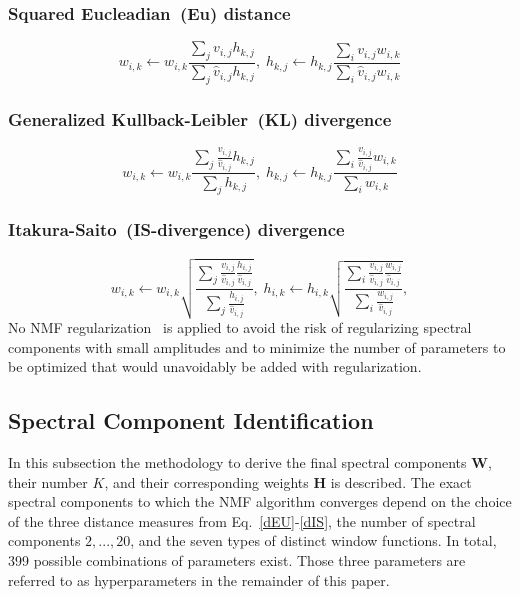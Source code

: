 \documentclass[lettersize,journal]{IEEEtran}
\begin{document}
\subsubsection{Squared Eucleadian~(Eu) distance}
\begin{equation}
    w_{i,k} \leftarrow w_{i,k}\frac{\sum_j {v_{i,j}h_{k,j}}}{\sum_j \hat{v}_{i,j}h_{k,j}}, \; 
    h_{k,j} \leftarrow h_{k,j}\frac{\sum_i {v_{i,j}w_{i,k}}}{\sum_i \hat{v}_{i,j}w_{i,k}}
\end{equation} 
\subsubsection{Generalized Kullback-Leibler~(KL) divergence}
\begin{equation}
    w_{i,k} \leftarrow w_{i,k}\frac{\sum_j \frac{v_{i,j}}{{\hat{v}_{i,j}} }h_{k,j}}{\sum_j h_{k,j}}, \; 
    h_{k,j} \leftarrow h_{k,j} \frac{\sum_i \frac{v_{i,j}}{\hat{v}_{i,j}} w_{i,k}}{\sum_i w_{i,k}}
\end{equation} 
\subsubsection{Itakura-Saito~(IS-divergence) divergence}
\begin{equation}
    w_{i,k} \leftarrow w_{i,k} \sqrt{\frac{ \sum_j  \frac{v_{i,j}}{{\hat{v}_{i,j}}} \frac{h_{i,j}}{{\hat{v}_{i,j}}}   }{\sum_j \frac{h_{i,j}}{{\hat{v}_{i,j}}} }}, \;
    h_{i,k} \leftarrow h_{i,k} \sqrt{\frac{ \sum_i  \frac{v_{i,j}}{{\hat{v}_{i,j}}} \frac{w_{i,j}}{{\hat{v}_{i,j}}}   }{\sum_i \frac{w_{i,j}}{{\hat{v}_{i,j}}} }},
\end{equation} 
No NMF regularization~\cite{wang2012nonnegative, Peharz2010} is applied to avoid the risk of regularizing spectral components with small amplitudes and to minimize the number of parameters to be optimized that would unavoidably be added with regularization.

\subsection{Spectral Component Identification} \label{Component Identification}
In this subsection the methodology to derive the final spectral components $\mathbf{W}$, their number $K$, and their corresponding weights $\mathbf{H}$ is described. 
The exact spectral components to which the NMF algorithm converges depend on the choice of the three distance measures from Eq.~\ref{dEU}-\ref{dIS}, the number of spectral components $2, ... ,20$, and the seven types of distinct window functions. In total, 399 possible combinations of parameters exist. 
Those three parameters are referred to as hyperparameters in the remainder of this paper.
\end{document}
